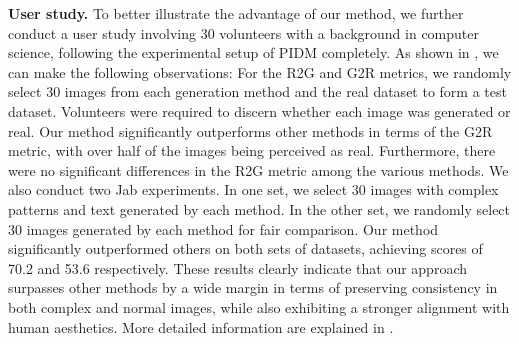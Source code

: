 \textbf{User study.}
%
To better illustrate the advantage of our method, we further conduct a user study involving 30 volunteers with a background in computer science, following the experimental setup of PIDM \cite{bhunia2023person} completely.
%
As shown in , we can make the following observations:
 For the R2G and G2R metrics, we randomly select 30 images from each generation method and the real dataset to form a test dataset. Volunteers were required to discern whether each image was generated or real. Our method significantly outperforms other methods in terms of the G2R metric, with over half of the images being perceived as real. Furthermore, there were no significant differences in the R2G metric among the various methods.
  We also conduct two Jab experiments. In one set, we select 30 images with complex patterns and text generated by each method. In the other set, we randomly select 30 images generated by each method for fair comparison. Our method significantly outperformed others on both sets of datasets, achieving scores of 70.2 and 53.6 respectively. These results clearly indicate that our approach surpasses other methods by a wide margin in terms of preserving consistency in both complex and normal images, while also exhibiting a stronger alignment with human aesthetics. More detailed information are explained in .

